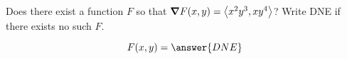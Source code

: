 \documentclass{ximera}
\author{David Guichard \and Neal Koblitz \and H. Jerome Keisler \and Albert Scheller \and Barry Balof \and Mike Wills \and Matthew Carr}
\begin{document}
\begin{exercise}




Does there exist a function $F$ so that $\boldsymbol\nabla F(x,y)=\left\langle x^2 y^3,xy^4\right\rangle$? Write DNE if there exists no such $F$. 

\begin{prompt}
\[
F(x,y)=\answer{DNE}
\]
\end{prompt}
\end{exercise}
\end{document}
